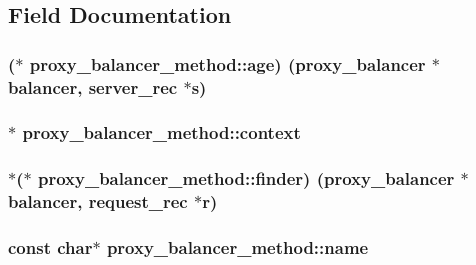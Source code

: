 \subsection{Field Documentation}
\subsubsection[{\texorpdfstring{age}{age}}]{($\ast$ proxy\+\_\+balancer\+\_\+method\+::age) ({\bf proxy\+\_\+balancer} $\ast${\bf balancer}, {\bf server\+\_\+rec} $\ast${\bf s})}\hypertarget{structproxy__balancer__method_ad1a0fe68a23f296bb2d7b0840adcebba}{}\label{structproxy__balancer__method_ad1a0fe68a23f296bb2d7b0840adcebba}
\subsubsection[{\texorpdfstring{context}{context}}]{$\ast$ proxy\+\_\+balancer\+\_\+method\+::context}\hypertarget{structproxy__balancer__method_af0c6118e64da9ca7746569e43f8544e1}{}\label{structproxy__balancer__method_af0c6118e64da9ca7746569e43f8544e1}
\subsubsection[{\texorpdfstring{finder}{finder}}]{$\ast$($\ast$ proxy\+\_\+balancer\+\_\+method\+::finder) ({\bf proxy\+\_\+balancer} $\ast${\bf balancer}, {\bf request\+\_\+rec} $\ast${\bf r})}\hypertarget{structproxy__balancer__method_ab0a5402056824384377a61d20712dd15}{}\label{structproxy__balancer__method_ab0a5402056824384377a61d20712dd15}
\subsubsection[{\texorpdfstring{name}{name}}]{\setlength{\rightskip}{0pt plus 5cm}const char$\ast$ proxy\+\_\+balancer\+\_\+method\+::name}\hypertarget{structproxy__balancer__method_ae95b994676041cb871ee4508dd8ffa05}{}\label{structproxy__balancer__method_ae95b994676041cb871ee4508dd8ffa05}
